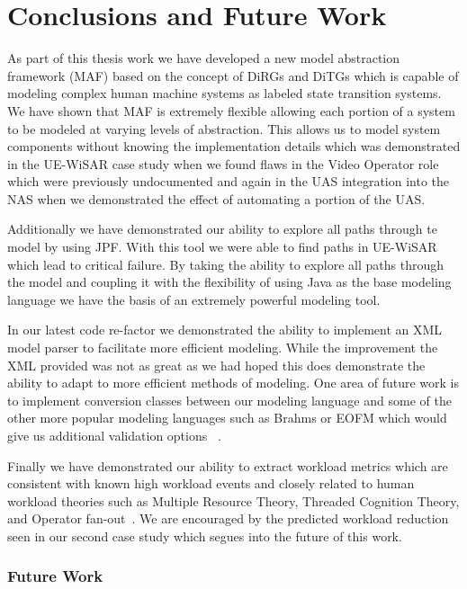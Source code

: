 \chapter{Conclusions and Future Work}

As part of this thesis work we have developed a new model abstraction framework (MAF) based on the concept of DiRGs and DiTGs which is capable of modeling complex human machine systems as labeled state transition systems.  We have shown that MAF is extremely flexible allowing each portion of a system to be modeled at varying levels of abstraction.  This allows us to model system components without knowing the implementation details which was demonstrated in the UE-WiSAR case study when we found flaws in the Video Operator role which were previously undocumented and again in the UAS integration into the NAS when we demonstrated the effect of automating a portion of the UAS.  

Additionally we have demonstrated our ability to explore all paths through te model by using JPF.  With this tool we were able to find paths in UE-WiSAR which lead to critical failure.  By taking the ability to explore all paths through the model and coupling it with the flexibility of using Java as the base modeling language we have the basis of an extremely powerful modeling tool.

In our latest code re-factor we demonstrated the ability to implement an XML model parser to facilitate more efficient modeling.  While the improvement the XML provided was not as great as we had hoped this does demonstrate the ability to adapt to more efficient methods of modeling.  One area of future work is to implement conversion classes between our modeling language and some of the other more popular modeling languages such as Brahms or EOFM which would give us additional validation options ~\cite{bolton2013litreview}.

Finally we have demonstrated our ability to extract workload metrics which are consistent with known high workload events and closely related to human workload theories such as Multiple Resource Theory, Threaded Cognition Theory, and Operator fan-out~\cite{wickens2002multiple, salvucci2008threaded, cummings2007predicting}.  We are encouraged by the predicted workload reduction seen in our second case study which segues into the future of this work.

\subsection{Future Work}

